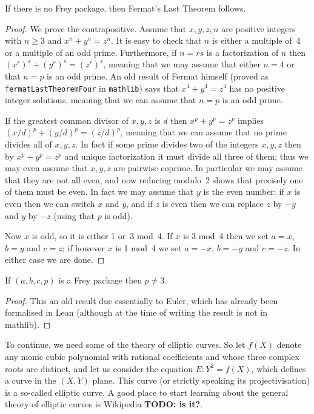 \begin{lemma}\label{WLOG_n_prime}
  If there is no Frey package, then Fermat's Last Theorem follows.
\end{lemma}
\begin{proof} We prove the contrapositive.
  Assume that $x,y,z,n$ are positive integers with $n\geq3$ and $x^n+y^n=z^n$. It is easy to check that $n$ is either a multiple of~4 or a multiple of an odd prime. Furthermore, if $n=rs$ is a factorization of $n$ then $(x^r)^s+(y^r)^s=(z^r)^s$, meaning that we may assume that either $n=4$ or that $n=p$ is an odd prime. An old result of Fermat himself (proved as {\tt fermatLastTheoremFour} in {\tt mathlib}) says that $x^4+y^4=z^4$ has no positive integer solutions, meaning that we can assume that $n=p$ is an odd prime.

  If the greatest common divisor of $x,y,z$ is $d$ then $x^p+y^p=z^p$ implies $(x/d)^p+(y/d)^p=(z/d)^p$, meaning that we can assume that no prime divides all of $x,y,z$. In fact if some prime divides two of the integers $x,y,z$ then by $x^p+y^p=z^p$ and unique factorization it must divide all three of them; thus we may even assume that $x,y,z$ are pairwise coprime. In particular we may assume that they are not all even, and now reducing modulo~2 shows that precisely one of them must be even. In fact we may assume that $y$ is the even number: if $x$ is even then we can switch $x$ and $y$, and if $z$ is even then we can replace $z$ by $-y$ and $y$ by $-z$ (using that $p$ is odd).

  Now $x$ is odd, so it is either 1 or~3 mod~4. If $x$ is 3 mod~4 then we set $a=x$, $b=y$ and $c=z$; if however $x$ is 1 mod~4 we set $a=-x$, $b=-y$ and $c=-z$. In either case we are done.
\end{proof}

\begin{lemma}\label{WLOG_p_at_least_5} If $(a,b,c,p)$ is a Frey package then $p\not=3$.
\end{lemma}
\begin{proof} This an old result due essentially to Euler, which has already been formalised in Lean (although at the time of writing the result is not in mathlib).
\end{proof}

To continue, we need some of the theory of elliptic curves. So let $f(X)$ denote any monic cubic polynomial with rational coefficients and whose three complex roots are distinct, and let us consider the equation $E:Y^2=f(X)$, which defines a curve in the $(X,Y)$ plane. This curve (or strictly speaking its projectivisation) is a so-called elliptic curve. A good place to start learning about the general theory of elliptic curves is Wikipedia {\bf TODO: is it?}. 

